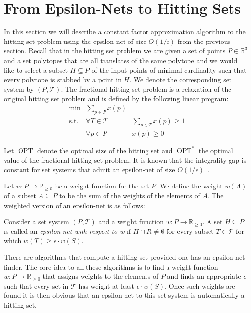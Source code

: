 \documentclass{stacs_proc}
\newcommand{\bigO}{O}
\newcommand{\setR}{\mathbb{R}}
\newcommand{\T}{\mathcal{T}}
\DeclareMathOperator{\st}{s.t.}
\DeclareMathOperator{\opt}{OPT}
\begin{document}
\section{From Epsilon-Nets to Hitting Sets}
In this section we will describe a constant factor approximation
algorithm to the hitting set problem using the epsilon-net of size
$\bigO(1/ \epsilon)$ from the previous section. 
Recall that in the hitting set problem we are given a set of points
$P\in \setR^3$ and a set polytopes  that are all translates of the same
polytope and we would like to select a subset $H\subseteq P$ of the input
points of minimal cardinality such that every polytope is stabbed by a
point in $H$. We denote the corresponding set system by $(P, \T)$. 
The fractional hitting set problem is a relaxation of the original
hitting set problem and is defined by the following linear program: 
\begin{eqnarray}
  \min & \sum_{p\in P} x(p) \\
  \st & \forall T \in \T & \sum_{p\in T} x(p) \geq 1 \\
  & \forall p\in P & x(p)\geq 0
\end{eqnarray} 

Let $\opt$ denote the optimal size of the hitting set and $\opt^*$ the
optimal value of the fractional hitting set problem. It is known that
the integrality gap is constant for set systems that admit an
epsilon-net of size $\bigO(1/ \epsilon)$~\cite{PA95}.  

Let $w: P \to \setR_{\geq 0}$ be a weight function for the set $P$. We define
the weight $w(A)$ of a subset $A\subseteq P$ to be the sum of the weights of
the elements of $A$. The weighted version of an epsilon-net is as
follows: 
\begin{defi}
  Consider a set system $(P, \T)$ and a weight function $w: P\to \setR_{\geq
    0}$. A set $H\subseteq P$ is called an \emph{epsilon-net with respect to 
    $w$} if $H\cap R\neq \emptyset$ for every subset $T\in \T$ for which $w(T)\geq \epsilon \cdot
  w(S)$. 
\end{defi}
There are algorithms that compute a hitting set provided one has an
epsilon-net finder.  
The core idea to all these algorithms is to find a weight function $w
: P\to \setR_{\geq 0}$ that assigns weights to the elements of $P$ and finds an
appropriate $\epsilon$ such that every set in $\T$ has weight at least $\epsilon \cdot
w(S)$. Once such weights are found it is then obvious that an
epsilon-net to this set system is automatically a hitting set. 
\end{document}

